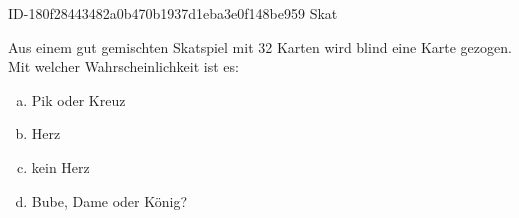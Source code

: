 \begin{exercise}
      {ID-180f28443482a0b470b1937d1eba3e0f148be959}
      {Skat}
  \ifproblem\problem\par
    Aus einem gut gemischten Skatspiel mit 32 Karten wird blind eine Karte gezogen.
    Mit welcher Wahrscheinlichkeit ist es:
    \begin{center}
      \begin{minipage}{0.38\textwidth}
        \begin{enumerate}[a)]
          \item Pik oder Kreuz
          \item Herz
        \end{enumerate}
      \end{minipage}%
      \begin{minipage}{0.38\textwidth}
        \begin{enumerate}[a)]
          \setcounter{enumi}{2}
          \item kein Herz
          \item Bube, Dame oder König?
        \end{enumerate}
      \end{minipage}
    \end{center}
  \fi
\end{exercise}
